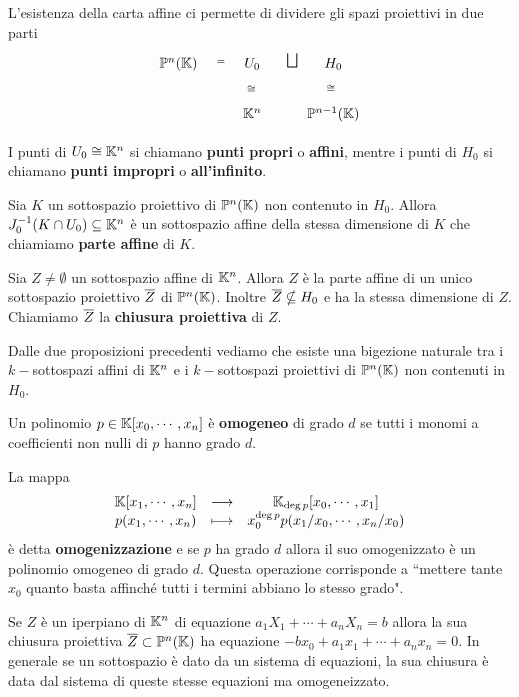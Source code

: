 \begin{multicols*}{2}
    \noindent
    L'esistenza della carta affine ci permette di dividere gli spazi proiettivi in due parti
    \[\begin{tikzcd}
    {\mathbb{P}^n(\mathbb{K})} & {U_0} & {H_0} \\
    & {\mathbb{K}^n} & {\mathbb{P}^{n-1}(\mathbb{K})}
    \arrow["\bigsqcup", shift right=2, draw=none, from=1-2, to=1-3]
    \arrow["\cong"', shift left=2, draw=none, from=1-2, to=2-2]
    \arrow["\cong", shift right=3, draw=none, from=1-3, to=2-3]
    \arrow["{=}", shift right=1, draw=none, from=1-1, to=1-2]
    \end{tikzcd}\]
    \begin{definition}
        I punti di $U_0\cong\mathbb{K}^n$ si chiamano \textbf{punti propri} o \textbf{affini}, mentre i punti di $H_0$ si chiamano \textbf{punti impropri} o \textbf{all'infinito}.
    \end{definition}

    \begin{proposition}
    Sia $K$ un sottospazio proiettivo di $\mathbb{P}^n(\mathbb{K})$ non contenuto in $H_0$. Allora $J_0^{-1}(K\cap U_0)\subseteq \mathbb{K}^n$ \`e un sottospazio affine della stessa dimensione di $K$ che chiamiamo \textbf{parte affine} di $K$.
    \end{proposition}

    \begin{proposition}
    Sia $Z\neq\emptyset$ un sottospazio affine di $\mathbb{K}^n$. Allora $Z$ \`e la parte affine di un unico sottospazio proiettivo $\overline{Z}$ di $\mathbb{P}^n(\mathbb{K})$. Inoltre $\overline{Z}\nsubseteq H_0$ e ha la stessa dimensione di $Z$. Chiamiamo $\overline{Z}$ la \textbf{chiusura proiettiva} di $Z$.
    \end{proposition}

    Dalle due proposizioni precedenti vediamo che esiste una bigezione naturale tra i $k-$sottospazi affini di $\mathbb{K}^n$ e i $k-$sottospazi proiettivi di $\mathbb{P}^n(\mathbb{K})$ non contenuti in $H_0$.

    \begin{definition}
    Un polinomio $p\in\mathbb{K}[x_0,\cdots,x_n]$ \`e \textbf{omogeneo} di grado $d$ se tutti i monomi a coefficienti non nulli di $p$ hanno grado $d$.
    \end{definition}
    \begin{remark}
    La mappa
    \[\begin{array}{ccc} {\mathbb{K}[x_1,\cdots,x_n]} & \longrightarrow & {\mathbb{K}_{\deg p}[x_0,\cdots,x_1]}\\ {p(x_1,\cdots,x_n)} & \longmapsto & {x_0^{\deg p}p(x_1/x_0,\cdots,x_n/x_0)} \end{array}\]
    \`e detta \textbf{omogenizzazione} e se $p$ ha grado $d$ allora il suo omogenizzato \`e un polinomio omogeneo di grado $d$. Questa operazione corrisponde a ``mettere tante $x_0$ quanto basta affinch\'e tutti i termini abbiano lo stesso grado".
    \end{remark}
    \begin{remark}
    Se $Z$ \`e un iperpiano di $\mathbb{K}^n$ di equazione $a_1X_1+\cdots+a_n X_n=b$ allora la sua chiusura proiettiva $\overline{Z}\subset\mathbb{P}^n(\mathbb{K})$ ha equazione $-bx_0+a_1x_1+\cdots+a_nx_n=0$. In generale se un sottospazio \`e dato da un sistema di equazioni, la sua chiusura \`e data dal sistema di queste stesse equazioni ma omogeneizzato.
    \end{remark}


\end{multicols*}
